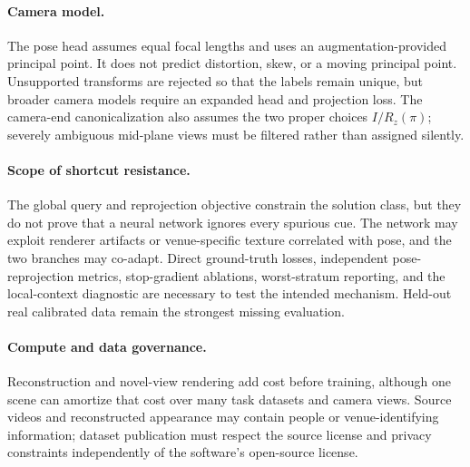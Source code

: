 \paragraph{Camera model.}
The pose head assumes equal focal lengths and uses an augmentation-provided
principal point.  It does not predict distortion, skew, or a moving principal
point.  Unsupported transforms are rejected so that the labels remain unique,
but broader camera models require an expanded head and projection loss.  The
camera-end canonicalization also assumes the two proper choices
\(I/R_z(\pi)\); severely ambiguous mid-plane views must be filtered rather than
assigned silently.

\paragraph{Scope of shortcut resistance.}
The global query and reprojection objective constrain the solution class, but
they do not prove that a neural network ignores every spurious cue.  The network
may exploit renderer artifacts or venue-specific texture correlated with pose,
and the two branches may co-adapt.  Direct ground-truth losses, independent
pose-reprojection metrics, stop-gradient ablations, worst-stratum reporting,
and the local-context diagnostic are necessary to test the intended mechanism.
Held-out real calibrated data remain the strongest missing evaluation.

\paragraph{Compute and data governance.}
Reconstruction and novel-view rendering add cost before training, although one
scene can amortize that cost over many task datasets and camera views.  Source
videos and reconstructed appearance may contain people or venue-identifying
information; dataset publication must respect the source license and privacy
constraints independently of the software's open-source license.
